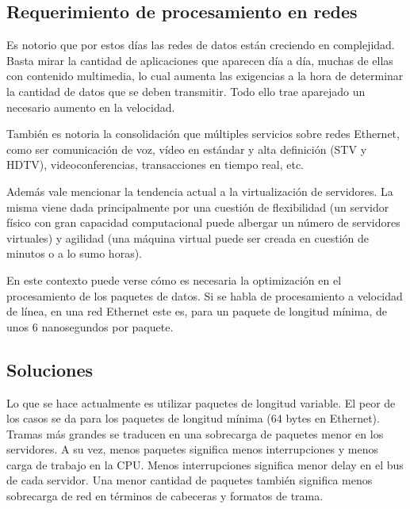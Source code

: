 \subsection{Requerimiento de procesamiento en redes}
Es notorio que por estos días las redes de datos están creciendo en complejidad. Basta mirar la cantidad de aplicaciones que aparecen día a día, muchas de ellas con contenido multimedia, lo cual aumenta las exigencias a la hora de determinar la cantidad de datos que se deben transmitir. Todo ello trae aparejado un necesario aumento en la velocidad. 


También es notoria la consolidación que múltiples servicios sobre redes Ethernet, como ser comunicación de voz, vídeo en estándar y alta definición (STV y HDTV), videoconferencias, transacciones en tiempo real, etc.


Además vale mencionar la tendencia actual a la virtualización de servidores. La misma viene dada principalmente por una cuestión de flexibilidad (un servidor físico con gran capacidad computacional puede albergar un número de servidores virtuales) y agilidad (una máquina virtual puede ser creada en cuestión de minutos o a lo sumo horas).

En este contexto puede verse cómo es necesaria la optimización en el procesamiento de los paquetes de datos. Si se habla de procesamiento a velocidad de línea, en una red Ethernet este es, para un paquete de longitud mínima, de unos 6 nanosegundos por paquete.


\subsection{Soluciones}
Lo que se hace actualmente es utilizar paquetes de longitud variable. El peor de los casos se da para los paquetes de longitud mínima (64 bytes en Ethernet). Tramas más grandes se traducen en una sobrecarga de paquetes menor en los servidores. A su vez, menos paquetes significa menos interrupciones y menos carga de trabajo en la CPU. Menos interrupciones significa menor delay en el bus de cada servidor. Una menor cantidad de paquetes también significa menos sobrecarga de red en términos de cabeceras y formatos de trama.

